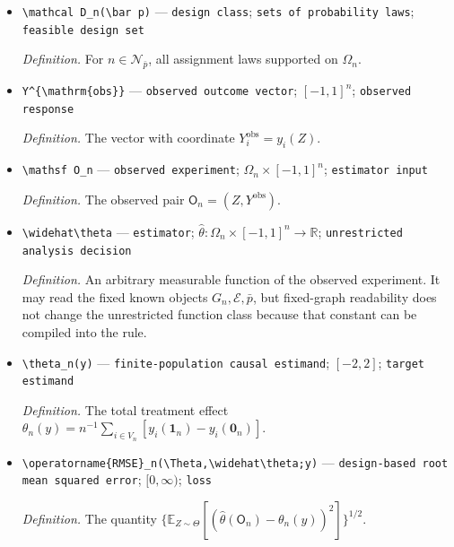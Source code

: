 \documentclass{article}
\begin{document}
\begin{itemize}
  \par\smallskip\noindent\emph{Definition.} A budget-feasible randomized experimental design for \(Z\).
  \item \texttt{\textbackslash{}\allowbreak{}mathcal D\_\allowbreak{}n(\textbackslash{}\allowbreak{}bar p)} --- \texttt{design class}; \texttt{sets of probability laws}; \texttt{feasible design set}
  \par\smallskip\noindent\emph{Definition.} For \(n\in\mathcal N_{\bar p}\), all assignment laws supported on \(\Omega_n\).
  \item \texttt{Y\textasciicircum{}\{\textbackslash{}\allowbreak{}mathrm\{obs\}\allowbreak{}\}\allowbreak{}} --- \texttt{observed outcome vector}; \([-1,1]^n\); \texttt{observed response}
  \par\smallskip\noindent\emph{Definition.} The vector with coordinate \(Y_i^{\mathrm{obs}}=y_i(Z)\).
  \item \texttt{\textbackslash{}\allowbreak{}mathsf O\_\allowbreak{}n} --- \texttt{observed experiment}; \(\Omega_n\times[-1,1]^n\); \texttt{estimator input}
  \par\smallskip\noindent\emph{Definition.} The observed pair \(\mathsf O_n=(Z,Y^{\mathrm{obs}})\).
  \item \texttt{\textbackslash{}\allowbreak{}widehat\textbackslash{}\allowbreak{}theta} --- \texttt{estimator}; \(\widehat\theta:\Omega_n\times[-1,1]^n\to\mathbb R\); \texttt{unrestricted analysis decision}
  \par\smallskip\noindent\emph{Definition.} An arbitrary measurable function of the observed experiment. It may read the fixed known objects \(G_n,\mathcal E,\bar p\), but fixed-graph readability does not change the unrestricted function class because that constant can be compiled into the rule.
  \item \texttt{\textbackslash{}\allowbreak{}theta\_\allowbreak{}n(y)} --- \texttt{finite-\allowbreak{}population causal estimand}; \([-2,2]\); \texttt{target estimand}
  \par\smallskip\noindent\emph{Definition.} The total treatment effect \(\theta_n(y)=n^{-1}\sum_{i\in V_n}[y_i(\mathbf 1_n)-y_i(\mathbf 0_n)]\).
  \item \texttt{\textbackslash{}\allowbreak{}operatorname\{RMSE\}\allowbreak{}\_\allowbreak{}n(\textbackslash{}\allowbreak{}Theta,\allowbreak{}\textbackslash{}\allowbreak{}widehat\textbackslash{}\allowbreak{}theta;\allowbreak{}y)} --- \texttt{design-\allowbreak{}based root mean squared error}; \([0,\infty)\); \texttt{loss}
  \par\smallskip\noindent\emph{Definition.} The quantity \(\{\mathbb E_{Z\sim\Theta}[(\widehat\theta(\mathsf O_n)-\theta_n(y))^2]\}^{1/2}\).

\end{itemize}
\end{document}
